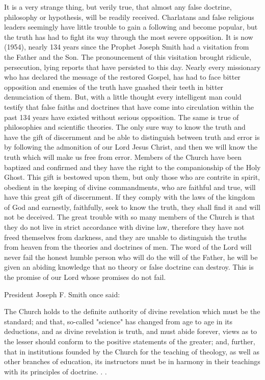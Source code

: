 It is a very strange thing, but verily true, that almost any false doctrine, philosophy or
hypothesis, will be readily received. Charlatans and false religious leaders seemingly have
little trouble to gain a following and become popular, but the truth has had to fight its way
through the most severe opposition. It is now (1954), nearly 134 years since the Prophet
Joseph Smith had a visitation from the Father and the Son. The pronouncement of this
visitation brought ridicule, persecution, lying reports that have persisted to this day. Nearly
every missionary who has declared the message of the restored Gospel, has had to face bitter
opposition and enemies of the truth have gnashed their teeth in bitter denunciation of them.
But, with a little thought every intelligent man could testify that false faiths and doctrines that
have come into circulation within the past 134 years have existed without serious opposition.
The same is true of philosophies and scientific theories. The only sure way to know the truth
and have the gift of discernment and be able to distinguish between truth and error is by
following the admonition of our Lord Jesus Christ, and then we will know the truth which
will make us free from error. Members of the Church have been baptized and confirmed and
they have the right to the companionship of the Holy Ghost. This gift is bestowed upon them,
but only those who are contrite in spirit, obedient in the keeping of divine commandments,
who are faithful and true, will have this great gift of discernment. If they comply with the
laws of the kingdom of God and earnestly, faithfully, seek to know the truth, they shall find it
and will not be deceived. The great trouble with so many members of the Church is that they
do not live in strict accordance with divine law, therefore they have not freed themselves
from darkness, and they are unable to distinguish the truths from heaven from the theories
and doctrines of men. The word of the Lord will never fail the honest humble person who
will do the will of the Father, he will be given an abiding knowledge that no theory or false
doctrine can destroy. This is the promise of our Lord whose promises do not fail.

President Joseph F. Smith once said:

The Church holds to the definite authority of divine revelation which must be the standard;
and that, so-called "science" has changed from age to age in its deductions, and as divine
revelation is truth, and must abide forever, views as to the lesser should conform to the
positive statements of the greater; and, further, that in institutions founded by the Church for
the teaching of theology, as well as other branches of education, its instructors must be in
harmony in their teachings with its principles of doctrine. . .

